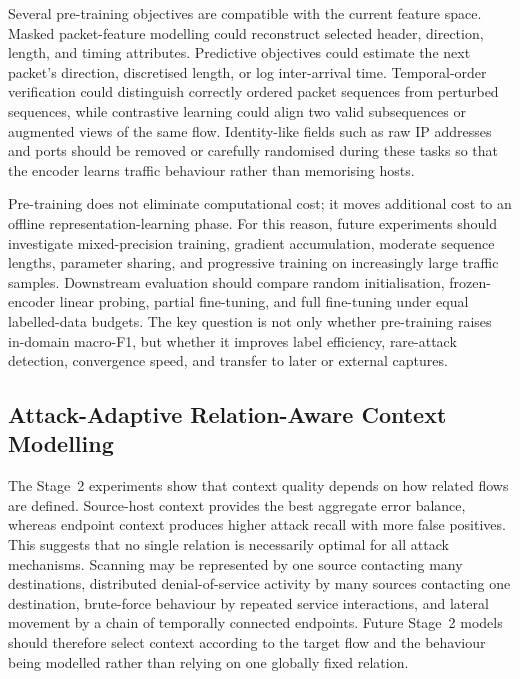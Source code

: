 \documentclass[11pt,fleqn]{report}
\begin{document}
Several pre-training objectives are compatible with the current feature space. Masked packet-feature modelling could reconstruct selected header, direction, length, and timing attributes. Predictive objectives could estimate the next packet's direction, discretised length, or log inter-arrival time. Temporal-order verification could distinguish correctly ordered packet sequences from perturbed sequences, while contrastive learning could align two valid subsequences or augmented views of the same flow. Identity-like fields such as raw IP addresses and ports should be removed or carefully randomised during these tasks so that the encoder learns traffic behaviour rather than memorising hosts.

Pre-training does not eliminate computational cost; it moves additional cost to an offline representation-learning phase. For this reason, future experiments should investigate mixed-precision training, gradient accumulation, moderate sequence lengths, parameter sharing, and progressive training on increasingly large traffic samples. Downstream evaluation should compare random initialisation, frozen-encoder linear probing, partial fine-tuning, and full fine-tuning under equal labelled-data budgets. The key question is not only whether pre-training raises in-domain macro-F1, but whether it improves label efficiency, rare-attack detection, convergence speed, and transfer to later or external captures.

\subsection{Attack-Adaptive Relation-Aware Context Modelling}
\label{subsubsec:future_relation_aware_context}

The Stage~2 experiments show that context quality depends on how related flows are defined. Source-host context provides the best aggregate error balance, whereas endpoint context produces higher attack recall with more false positives. This suggests that no single relation is necessarily optimal for all attack mechanisms. Scanning may be represented by one source contacting many destinations, distributed denial-of-service activity by many sources contacting one destination, brute-force behaviour by repeated service interactions, and lateral movement by a chain of temporally connected endpoints. Future Stage~2 models should therefore select context according to the target flow and the behaviour being modelled rather than relying on one globally fixed relation.
\end{document}
